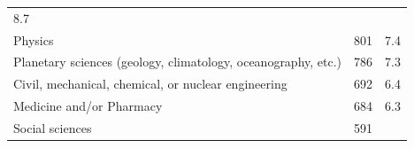 \documentclass[]{article}
\begin{document}
\begin{longtable}[]{@{}lrr@{}}
\begin{minipage}[t]{0.05\columnwidth}
8.7\strut
\end{minipage}\tabularnewline
\begin{minipage}[t]{0.81\columnwidth}\raggedright\strut
Physics\strut
\end{minipage} & \begin{minipage}[t]{0.05\columnwidth}\raggedleft\strut
801\strut
\end{minipage} & \begin{minipage}[t]{0.05\columnwidth}\raggedleft\strut
7.4\strut
\end{minipage}\tabularnewline
\begin{minipage}[t]{0.81\columnwidth}\raggedright\strut
Planetary sciences (geology, climatology, oceanography, etc.)\strut
\end{minipage} & \begin{minipage}[t]{0.05\columnwidth}\raggedleft\strut
786\strut
\end{minipage} & \begin{minipage}[t]{0.05\columnwidth}\raggedleft\strut
7.3\strut
\end{minipage}\tabularnewline
\begin{minipage}[t]{0.81\columnwidth}\raggedright\strut
Civil, mechanical, chemical, or nuclear engineering\strut
\end{minipage} & \begin{minipage}[t]{0.05\columnwidth}\raggedleft\strut
692\strut
\end{minipage} & \begin{minipage}[t]{0.05\columnwidth}\raggedleft\strut
6.4\strut
\end{minipage}\tabularnewline
\begin{minipage}[t]{0.81\columnwidth}\raggedright\strut
Medicine and/or Pharmacy\strut
\end{minipage} & \begin{minipage}[t]{0.05\columnwidth}\raggedleft\strut
684\strut
\end{minipage} & \begin{minipage}[t]{0.05\columnwidth}\raggedleft\strut
6.3\strut
\end{minipage}\tabularnewline
\begin{minipage}[t]{0.81\columnwidth}\raggedright\strut
Social sciences\strut
\end{minipage} & \begin{minipage}[t]{0.05\columnwidth}\raggedleft\strut
591\strut
\end{minipage} & \begin{minipage}[t]{0.05\columnwidth}\raggedleft\strut

\end{minipage}
\end{longtable}
\end{document}
